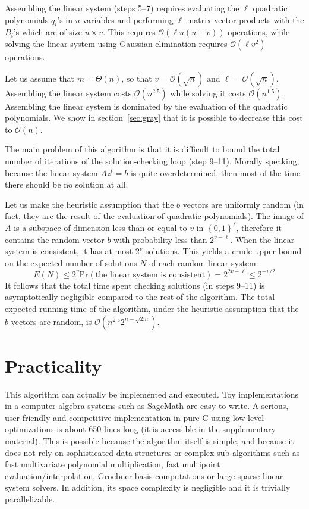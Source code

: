 \documentclass[a4paper,UKenglish,cleveref, autoref]{lipics-v2019}
\newcommand{\bits}{\left\{0, 1\right\}}
\newcommand{\bigO}[1]{\ensuremath{\mathcal{O}\left( #1 \right)} }
\newcommand{\bigTheta}[1]{\ensuremath{\Theta\left( #1 \right)} }
\begin{document}
Assembling the linear system (steps 5--7) requires evaluating the $\ell$
quadratic polynomials $q_i$'s in $u$ variables and performing $\ell$
matrix-vector products with the $B_i$'s which are of size $u \times v$.  This
requires $\bigO{\ell u(u+v)}$ operations, while solving the linear system using
Gaussian elimination requires $\bigO{\ell v^2}$ operations.

Let us assume that $m = \bigTheta{n}$, so that $v = \bigO{\sqrt{n}}$ and
$\ell = \bigO{\sqrt{n}}$. Assembling the linear system costs $\bigO{n^{2.5}}$
while solving it costs $\bigO{n^{1.5}}$. Assembling the linear system is
dominated by the evaluation of the quadratic polynomials. We show in
section~\ref{sec:gray} that it is possible to decrease this cost to $\bigO{n}$.

The main problem of this algorithm is that it is difficult to bound the total
number of iterations of the solution-checking loop (step 9--11). Morally
speaking, because the linear system $A z^t = b$ is quite overdetermined, then most
of the time there should be no solution at all.

Let us make the heuristic assumption that the $b$ vectors are uniformly random
(in fact, they are the result of the evaluation of quadratic polynomials). The
image of $A$ is a subspace of dimension less than or equal to $v$ in
$\bits^\ell$, therefore it contains the random vector $b$ with probability less
than $2^{v-\ell}$. When the linear system is consistent, it has at most $2^v$
solutions. This yields a crude upper-bound on the expected number of solutions
$N$ of each random linear system:
\[
E(N) \leq 2^v \mathrm{Pr}(\text{the linear system is consistent}) = 2^{2v - \ell} \leq 2^{-v/2}
\]
It follows that the total time spent checking solutions (in steps 9--11) is
asymptotically negligible compared to the rest of the algorithm.  The total
expected running time of the algorithm, under the heuristic assumption that the
$b$ vectors are random, is $\bigO{n^{2.5} 2^{n - \sqrt{2m}}}$.


\section{Practicality}

This algorithm can actually be implemented and executed. Toy implementations in
a computer algebra systems such as \textsf{SageMath} are easy to write. A
serious, user-friendly and competitive implementation in pure C using low-level
optimizations is about 650 lines long (it is accessible in the supplementary
material). This is possible because the algorithm itself is simple, and because
it does not rely on sophisticated data structures or complex sub-algorithms such
as fast multivariate polynomial multiplication, fast multipoint
evaluation/interpolation, Groebner basis computations or large sparse linear
system solvers. In addition, its space complexity is negligible and it is
trivially parallelizable.
\end{document}
